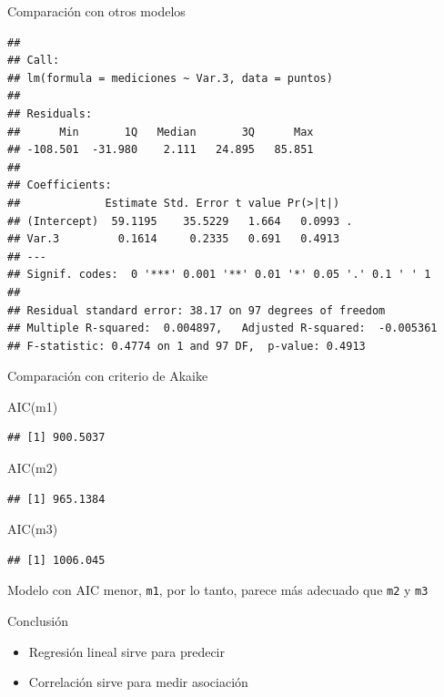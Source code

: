 \documentclass[
  11pt,
  ignorenonframetext,
]{beamer}
\newenvironment{Shaded}{}{}
\newcommand{\FunctionTok}[1]{\textcolor[rgb]{0.02,0.16,0.49}{#1}}
\newcommand{\NormalTok}[1]{#1}
\begin{document}
\begin{frame}[fragile]{Comparación con otros modelos}
\protect\hypertarget{comparaciuxf3n-con-otros-modelos-2}{}
\begin{verbatim}
## 
## Call:
## lm(formula = mediciones ~ Var.3, data = puntos)
## 
## Residuals:
##      Min       1Q   Median       3Q      Max 
## -108.501  -31.980    2.111   24.895   85.851 
## 
## Coefficients:
##             Estimate Std. Error t value Pr(>|t|)  
## (Intercept)  59.1195    35.5229   1.664   0.0993 .
## Var.3         0.1614     0.2335   0.691   0.4913  
## ---
## Signif. codes:  0 '***' 0.001 '**' 0.01 '*' 0.05 '.' 0.1 ' ' 1
## 
## Residual standard error: 38.17 on 97 degrees of freedom
## Multiple R-squared:  0.004897,   Adjusted R-squared:  -0.005361 
## F-statistic: 0.4774 on 1 and 97 DF,  p-value: 0.4913
\end{verbatim}
\end{frame}

\begin{frame}[fragile]{Comparación con criterio de Akaike}
\protect\hypertarget{comparaciuxf3n-con-criterio-de-akaike}{}
\begin{Shaded}
\begin{Highlighting}[]
\FunctionTok{AIC}\NormalTok{(m1)}
\end{Highlighting}
\end{Shaded}

\begin{verbatim}
## [1] 900.5037
\end{verbatim}

\begin{Shaded}
\begin{Highlighting}[]
\FunctionTok{AIC}\NormalTok{(m2)}
\end{Highlighting}
\end{Shaded}

\begin{verbatim}
## [1] 965.1384
\end{verbatim}

\begin{Shaded}
\begin{Highlighting}[]
\FunctionTok{AIC}\NormalTok{(m3)}
\end{Highlighting}
\end{Shaded}

\begin{verbatim}
## [1] 1006.045
\end{verbatim}

Modelo con AIC menor, \texttt{m1}, por lo tanto, parece más adecuado que
\texttt{m2} y \texttt{m3}
\end{frame}

\begin{frame}{Conclusión}
\protect\hypertarget{conclusiuxf3n}{}
\begin{itemize}
\item
  Regresión lineal sirve para predecir
\item
  Correlación sirve para medir asociación
\end{itemize}
\end{frame}
\end{document}
